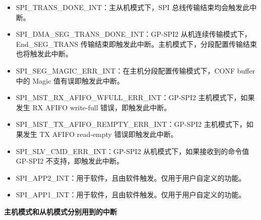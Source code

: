 \documentclass[main\_\_CN.tex]{subfiles}
\begin{document}
\begin{itemize}
\item \label{int:SPITRANSDONEINT}SPI\_TRANS\_DONE\_INT：主从机模式下，SPI 总线传输结束均会触发此中断。
\item \label{int:SPIDMASEGTRANSDONEINT}SPI\_DMA\_SEG\_TRANS\_DONE\_INT：GP-SPI2 从机连续传输模式下，End\_SEG\_TRANS 传输结束即触发此中断。主机模式下，分段配置传输结束也将触发此中断。
\item \label{int:SPISEGMAGICERRINT} SPI\_SEG\_MAGIC\_ERR\_INT：在主机分段配置传输模式下，CONF buffer 中的 Magic 值有误即触发此中断。


\item \label{int:SPIMSTRXAFIFOWFULLERRINT}
SPI\_MST\_RX\_AFIFO\_WFULL\_ERR\_INT：GP-SPI2 主机模式下，如果发生 RX AFIFO write-full 错误，即触发此中断。

\item \label{int:SPIMSTTXAFIFOREMPTYERRINT}
SPI\_MST\_TX\_AFIFO\_REMPTY\_ERR\_INT：GP-SPI2 主机模式下，如果发生 TX AFIFO read-empty 错误即触发此中断。

\item \label{int:SPISLVCMDERRINT} SPI\_SLV\_CMD\_ERR\_INT：GP-SPI2 从机模式下，如果接收到的命令值 GP-SPI2 不支持，即触发此中断。

\item \label{int:SPIAPP2INT}SPI\_APP2\_INT：用于软件，且由软件触发。仅用于用户自定义的功能。
\item \label{int:SPIAPP1INT}SPI\_APP1\_INT：用于软件，且由软件触发。仅用于用户自定义的功能。

\end{itemize}

\textbf{主机模式和从机模式分别用到的中断}
\end{document}
